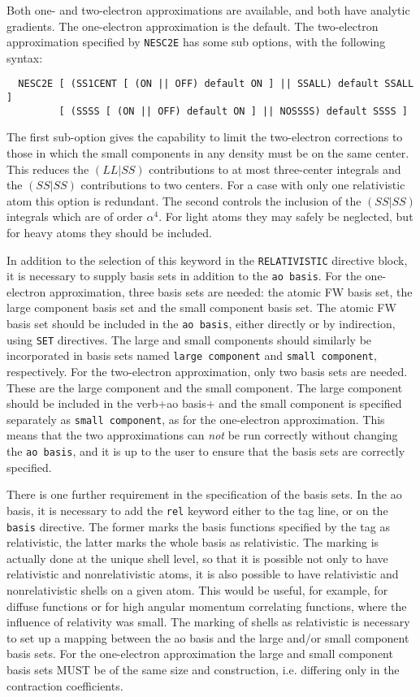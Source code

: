 Both one- and two-electron approximations are available, and both have
analytic gradients. The one-electron approximation is the default.
The two-electron approximation specified by \verb+NESC2E+ has some sub
options, with the following syntax:

\begin{verbatim}
  NESC2E [ (SS1CENT [ (ON || OFF) default ON ] || SSALL) default SSALL ]
         [ (SSSS [ (ON || OFF) default ON ] || NOSSSS) default SSSS ]

\end{verbatim}

The first sub-option gives the capability to limit the two-electron
corrections to those in which the small components in any density must be on
the same center.  This reduces the $(LL|SS)$ contributions to at most
three-center integrals and the $(SS|SS)$ contributions to two centers. For a
case with only one relativistic atom this option is redundant. The second
controls the inclusion of the $(SS|SS)$ integrals which are of order
$\alpha^4$. For light atoms they may safely be neglected, but for heavy
atoms they should be included. 

In addition to the selection of this keyword in the \verb+RELATIVISTIC+
directive block, it is necessary to supply basis sets in addition to the
\verb+ao basis+. For the one-electron approximation, three basis sets are
needed: the atomic FW basis set, the large component basis set and the small
component basis set. The atomic FW basis set should be included in the
\verb+ao basis+, either directly or by indirection, using \verb+SET+
directives.  The large and small components should similarly be incorporated
in basis sets named \verb+large component+ and \verb+small component+,
respectively. For the two-electron approximation, only two basis sets are
needed. These are the large component and the small component. The large component
should be included in the verb+ao basis+ and the small component
is specified separately as \verb+small component+, as for the one-electron
approximation. This means that the two approximations can {\it not} be run
correctly without changing the \verb+ao basis+, and it is up to the user to
ensure that the basis sets are correctly specified.

There is one further requirement in the specification of the basis sets. In
the ao basis, it is necessary to add the \verb+rel+ keyword either to the
tag line, or on the \verb+basis+ directive. The former marks the basis
functions specified by the tag as relativistic, the latter marks the whole
basis as relativistic. The marking is actually done at the unique shell
level, so that it is possible not only to have relativistic and
nonrelativistic atoms, it is also possible to have relativistic and
nonrelativistic shells on a given atom. This would be useful, for example,
for diffuse functions or for high angular momentum correlating functions,
where the influence of relativity was small. The marking of shells as
relativistic is necessary to set up a mapping between the ao basis and the
large and/or small component basis sets. For the one-electron approximation
the large and small component basis sets MUST be of the same size and
construction, i.e. differing only in the contraction coefficients.

